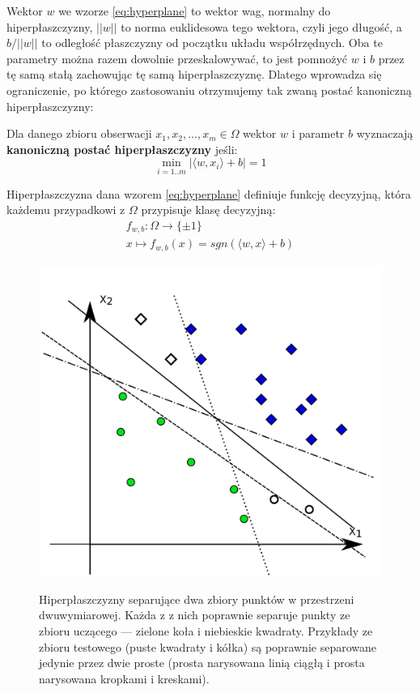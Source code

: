 Wektor $ w $ we wzorze \ref{eq:hyperplane} to wektor wag, normalny do hiperpłaszczyzny, $ ||w|| $ to norma euklidesowa tego wektora, czyli jego długość, a $ b/||w|| $ to odległość płaszczyzny od początku układu współrzędnych.
Oba te parametry można razem dowolnie przeskalowywać, to jest pomnożyć $ w $ i $ b $ przez tę samą stałą zachowując tę samą hiperpłaszczyznę. Dlatego wprowadza się ograniczenie, po którego zastosowaniu otrzymujemy tak zwaną postać kanoniczną hiperpłaszczyzny:
\begin{definicjaa}
Dla danego zbioru obserwacji $ x_1, x_2, ..., x_m \in \Omega $ wektor $ w $ i parametr $ b $ wyznaczają \textbf{kanoniczną postać hiperpłaszczyzny} jeśli:
\begin{equation}
	\min_{i=1..m} | \langle w, x_i \rangle + b | = 1
\label{eq:canonical}
\end{equation}
\end{definicjaa}


Hiperpłaszczyzna dana wzorem \ref{eq:hyperplane} definiuje funkcję decyzyjną, która każdemu przypadkowi z $ \Omega $ przypisuje klasę decyzyjną:
\begin{equation}
\begin{array}{lcl}
f_{w,b}: \Omega \rightarrow \{\pm 1\} \\ x \mapsto f_{w,b}(x) = sgn (\langle w, x \rangle + b)
\end{array}
\label{eq:decfunc}
\end{equation}

\begin{figure}[h]
\centering
\includegraphics[scale=0.5]{figures/functions/2-different-hyperplanes}
\label{fig:hyperplanes}
\caption{Hiperpłaszczyzny separujące dwa zbiory punktów w przestrzeni dwuwymiarowej. Każda z z nich poprawnie separuje punkty ze zbioru uczącego --- zielone koła i niebieskie kwadraty. Przykłady ze zbioru testowego (puste kwadraty i kółka) są poprawnie separowane jedynie przez dwie proste (prosta narysowana linią ciągłą i prosta narysowana kropkami i kreskami).}
\end{figure}

